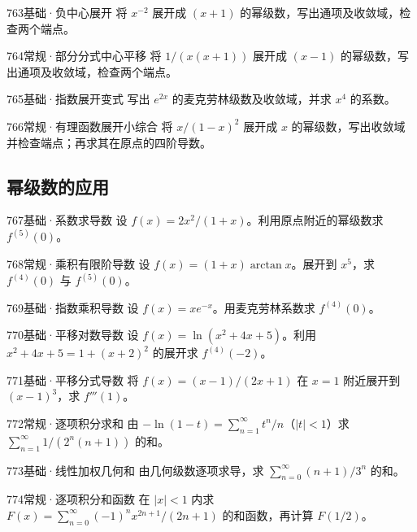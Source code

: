 \begin{exercise}{763}{基础·负中心展开}
将 $x^{-2}$ 展开成 $(x+1)$ 的幂级数，写出通项及收敛域，检查两个端点。
\end{exercise}
\begin{exercise}{764}{常规·部分分式中心平移}
将 $1/(x(x+1))$ 展开成 $(x-1)$ 的幂级数，写出通项及收敛域，检查两个端点。
\end{exercise}
\begin{exercise}{765}{基础·指数展开变式}
写出 $e^{2x}$ 的麦克劳林级数及收敛域，并求 $x^4$ 的系数。
\end{exercise}
\begin{exercise}{766}{常规·有理函数展开小综合}
将 $x/(1-x)^2$ 展开成 $x$ 的幂级数，写出收敛域并检查端点；再求其在原点的四阶导数。
\end{exercise}
\subsection{幂级数的应用}
\begin{exercise}{767}{基础·系数求导数}
设 $f(x)=2x^2/(1+x)$。利用原点附近的幂级数求 $f^{(5)}(0)$。
\end{exercise}
\begin{exercise}{768}{常规·乘积有限阶导数}
设 $f(x)=(1+x)\arctan x$。展开到 $x^5$，求 $f^{(4)}(0)$ 与 $f^{(5)}(0)$。
\end{exercise}
\begin{exercise}{769}{基础·指数乘积导数}
设 $f(x)=xe^{-x}$。用麦克劳林系数求 $f^{(4)}(0)$。
\end{exercise}
\begin{exercise}{770}{基础·平移对数导数}
设 $f(x)=\ln(x^2+4x+5)$。利用 $x^2+4x+5=1+(x+2)^2$ 的展开求 $f^{(4)}(-2)$。
\end{exercise}
\begin{exercise}{771}{基础·平移分式导数}
将 $f(x)=(x-1)/(2x+1)$ 在 $x=1$ 附近展开到 $(x-1)^3$，求 $f'''(1)$。
\end{exercise}
\begin{exercise}{772}{常规·逐项积分求和}
由 $-\ln(1-t)=\sum_{n=1}^{\infty}t^n/n$（$|t|<1$）求 $\sum_{n=1}^{\infty}1/(2^n(n+1))$ 的和。
\end{exercise}
\begin{exercise}{773}{基础·线性加权几何和}
由几何级数逐项求导，求 $\sum_{n=0}^{\infty}(n+1)/3^n$ 的和。
\end{exercise}
\begin{exercise}{774}{常规·逐项积分和函数}
在 $|x|<1$ 内求 $F(x)=\sum_{n=0}^{\infty}(-1)^nx^{2n+1}/(2n+1)$ 的和函数，再计算 $F(1/2)$。
\end{exercise}
